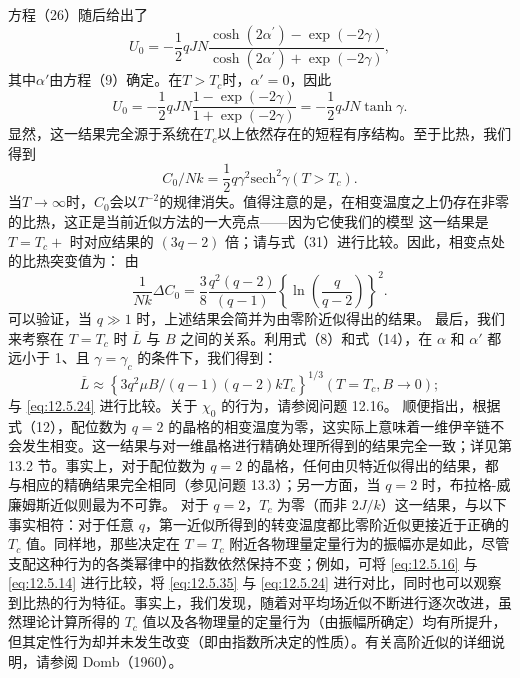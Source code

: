 方程（26）随后给出了
\begin{equation}\tag{12.5.60}\label{eq:12.5.60}
U _ { 0 } = - \frac { 1 } { 2 } q J N \frac { \cosh ( 2 \alpha ^{\prime} ) - \exp ( - 2 \gamma ) } { \cosh ( 2 \alpha ^{\prime} ) + \exp ( - 2 \gamma ) } ,
\end{equation}
其中\(\alpha'\)由方程（9）确定。在\(T > T_c\)时，\(\alpha' = 0\)，因此
\begin{equation}\tag{12.5.61}\label{eq:12.5.61}
U _ { 0 } = - \frac { 1 } { 2 } q J N \frac { 1 - \exp ( - 2 \gamma ) } { 1 + \exp ( - 2 \gamma ) } = - \frac { 1 } { 2 } q J N \operatorname { t a n h } \gamma .
\end{equation}
显然，这一结果完全源于系统在\(T_{c}\)以上依然存在的短程有序结构。至于比热，我们得到
\begin{equation}\tag{12.5.62}\label{eq:12.5.62}
C _ { 0 } / N k = \frac { 1 } { 2 } q \gamma ^{2} \mathrm { s e c h } ^{2} \gamma  ( T > T _ { c } ) .
\end{equation}
当\(T \rightarrow \infty\)时，\(C_0\)会以\(T^{-2}\)的规律消失。值得注意的是，在相变温度之上仍存在非零的比热，这正是当前近似方法的一大亮点——因为它使我们的模型
这一结果是 \(T = T_c +\) 时对应结果的 \((3q-2)\) 倍；请与式（31）进行比较。因此，相变点处的比热突变值为：
由
\begin{equation}\tag{12.5.63}\label{eq:12.5.63}
\frac { 1 } { N k } \Delta C _ { 0 } = \frac { 3 } { 8 } \frac { q ^{2} ( q - 2 ) } { ( q - 1 ) } \left\{ \ln \left( \frac { q } { q - 2 } \right) \right\} ^{2} .
\end{equation}
可以验证，当 \(q \gg 1\) 时，上述结果会简并为由零阶近似得出的结果。
最后，我们来考察在 \(T = T_c\) 时 \(\overline{L}\) 与 \(B\) 之间的关系。利用式（8）和式（14），在 \(\alpha\) 和 \(\alpha'\) 都远小于 1、且 \(\gamma = \gamma_{c}\) 的条件下，我们得到：
\begin{equation}\tag{12.5.64}\label{eq:12.5.64}
\overline { { L } } \approx \left\{ 3 q ^{2} \mu B / ( q - 1 ) ( q - 2 ) k T _ { c } \right\} ^{1 / 3}  ( T = T _ { c } , B \rightarrow 0 ) ;
\end{equation}
与 \autoref{eq:12.5.24} 进行比较。关于 \(\chi_{0}\) 的行为，请参阅问题 12.16。
顺便指出，根据式（12），配位数为 \(q=2\) 的晶格的相变温度为零，这实际上意味着一维伊辛链不会发生相变。这一结果与对一维晶格进行精确处理所得到的结果完全一致；详见第 13.2 节。事实上，对于配位数为 \(q=2\) 的晶格，任何由贝特近似得出的结果，都与相应的精确结果完全相同（参见问题 13.3）；另一方面，当 \(q=2\) 时，布拉格-威廉姆斯近似则最为不可靠。
对于 \(q=2\)，\(T_{c}\) 为零（而非 \(2J/k\)）这一结果，与以下事实相符：对于任意 \(q\)，第一近似所得到的转变温度都比零阶近似更接近于正确的 \(T_{c}\) 值。同样地，那些决定在 \(T=T_{c}\) 附近各物理量定量行为的振幅亦是如此，尽管支配这种行为的各类幂律中的指数依然保持不变；例如，可将 \autoref{eq:12.5.16} 与 \autoref{eq:12.5.14} 进行比较，将 \autoref{eq:12.5.35} 与 \autoref{eq:12.5.24} 进行对比，同时也可以观察到比热的行为特征。事实上，我们发现，随着对平均场近似不断进行逐次改进，虽然理论计算所得的 \(T_{c}\) 值以及各物理量的定量行为（由振幅所确定）均有所提升，但其定性行为却并未发生改变（即由指数所决定的性质）。有关高阶近似的详细说明，请参阅 Domb（1960）。
